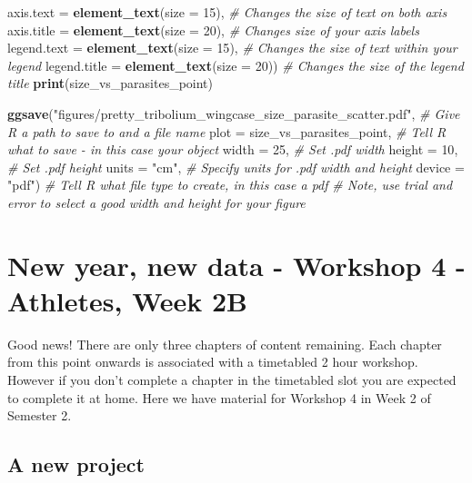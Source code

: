 \documentclass[
]{book}
\newenvironment{Shaded}{\begin{snugshade}}{\end{snugshade}}
\newcommand{\AttributeTok}[1]{\textcolor[rgb]{0.13,0.29,0.53}{#1}}
\newcommand{\CommentTok}[1]{\textcolor[rgb]{0.56,0.35,0.01}{\textit{#1}}}
\newcommand{\DecValTok}[1]{\textcolor[rgb]{0.00,0.00,0.81}{#1}}
\newcommand{\FunctionTok}[1]{\textcolor[rgb]{0.13,0.29,0.53}{\textbf{#1}}}
\newcommand{\NormalTok}[1]{#1}
\newcommand{\StringTok}[1]{\textcolor[rgb]{0.31,0.60,0.02}{#1}}
\begin{document}
\begin{Shaded}
\begin{Highlighting}[]
        \AttributeTok{axis.text =} \FunctionTok{element\_text}\NormalTok{(}\AttributeTok{size =} \DecValTok{15}\NormalTok{), }\CommentTok{\# Changes the size of text on both axis }
        \AttributeTok{axis.title =} \FunctionTok{element\_text}\NormalTok{(}\AttributeTok{size =} \DecValTok{20}\NormalTok{), }\CommentTok{\# Changes size of your axis labels }
        \AttributeTok{legend.text =} \FunctionTok{element\_text}\NormalTok{(}\AttributeTok{size =} \DecValTok{15}\NormalTok{), }\CommentTok{\# Changes the size of text within your legend}
        \AttributeTok{legend.title =} \FunctionTok{element\_text}\NormalTok{(}\AttributeTok{size =} \DecValTok{20}\NormalTok{)) }\CommentTok{\# Changes the size of the legend title  }
\FunctionTok{print}\NormalTok{(size\_vs\_parasites\_point)}

\FunctionTok{ggsave}\NormalTok{(}\StringTok{"figures/pretty\_tribolium\_wingcase\_size\_parasite\_scatter.pdf"}\NormalTok{, }\CommentTok{\# Give R a path to save to and a file name}
       \AttributeTok{plot =}\NormalTok{ size\_vs\_parasites\_point, }\CommentTok{\# Tell R what to save {-} in this case your object}
       \AttributeTok{width =} \DecValTok{25}\NormalTok{, }\CommentTok{\# Set .pdf width}
       \AttributeTok{height =} \DecValTok{10}\NormalTok{, }\CommentTok{\# Set .pdf height}
       \AttributeTok{units =} \StringTok{"cm"}\NormalTok{, }\CommentTok{\# Specify units for .pdf width and height}
       \AttributeTok{device =} \StringTok{"pdf"}\NormalTok{) }\CommentTok{\# Tell R what file type to create, in this case a pdf}
\CommentTok{\# Note, use trial and error to select a good width and height for your figure}
\end{Highlighting}
\end{Shaded}

\hypertarget{data-setup}{%
\chapter{New year, new data - Workshop 4 - Athletes, Week 2B}\label{data-setup}}

Good news! There are only three chapters of content remaining. Each chapter from this point onwards is associated with a timetabled 2 hour workshop. However if you don't complete a chapter in the timetabled slot you are expected to complete it at home. Here we have material for Workshop 4 in Week 2 of Semester 2.

\hypertarget{a-new-project}{%
\section{A new project}\label{a-new-project}}
\end{document}
